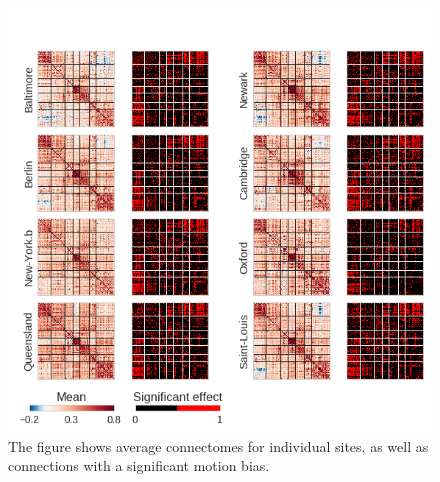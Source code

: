 \documentclass[authoryear]{elsarticle}
\begin{document}
\begin{figure}[htbp]
\begin{center}
\includegraphics[width=\linewidth]{../figures/connectome_multisite2_fd.png}
\end{center}
\caption[Connectome variability across sites]{
The figure shows average connectomes for individual sites, as well as connections with a significant motion bias.
}
\label{fig_connectome_variability_motion}
\end{figure}
\end{document}
